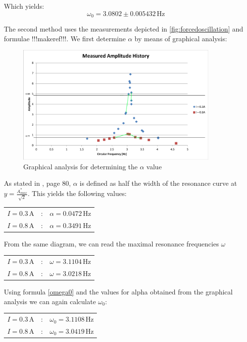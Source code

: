 \documentclass{scrreprt}
\newcommand{\unit}[1]{\ensuremath{\, \mathrm{#1}}}
\begin{document}
Which yields:
\begin{equation}
\omega_0 = 3.0802 \pm 0.005432 \unit{Hz}
\end{equation}

The second method uses the measurements depicted in \ref{fig:forcedoscillation} and formulae !!!makeref!!!.
We first determine $\alpha$ by means of graphical analysis:

\begin{figure}[H]
	\centering
  \includegraphics[width=0.9\textwidth]{diag/Width_measurement.png}
	\caption{Graphical analysis for determining the $\alpha$ value}
	\label{fig:graphical}
\end{figure}

As stated in \cite{physcript13}, page 80, $\alpha$ is defined as half the width of the resonance curve at $y=\frac{A^*_{max}}{\sqrt{2}}$. This yields the following values:

\begin{table}[h]
\center
\begin{tabular}{lcl}
$I = 0.3 \unit{A}$ &:& $\alpha = 0.0472\unit{Hz}$\\
$I = 0.8 \unit{A}$ &:& $\alpha = 0.3491\unit{Hz}$
\end{tabular}
\end{table}

From the same diagram, we can read the maximal resonance frequencies $\omega$

\begin{table}[h]
\center
\begin{tabular}{lcl}
$I = 0.3 \unit{A}$ &:& $\omega = 3.1104\unit{Hz}$\\
$I = 0.8 \unit{A}$ &:& $\omega = 3.0218\unit{Hz}$
\end{tabular}
\end{table}

Using formula \ref{omega0} and the values for alpha obtained from the graphical analysis we can again calculate $\omega_0$:
\begin{table}[h]
\center
\begin{tabular}{lcl}
$I = 0.3 \unit{A}$ &:& $\omega_0 = 3.1108\unit{Hz}$\\
$I = 0.8 \unit{A}$ &:& $\omega_0 = 3.0419
\unit{Hz}$
\end{tabular}
\end{table}
\end{document}
